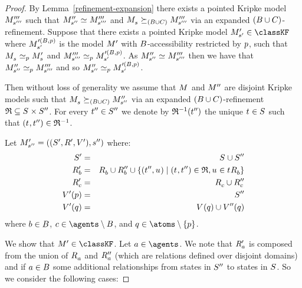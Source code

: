 \begin{proof}
By Lemma~\ref{refinement-expansion} there exists a pointed Kripke model $\kPModelPPP{\kStateSPPP}$ such that $\kPModelPP{\kStateSPP} \bisimilar \kPModelPPP{\kStateSPPP}$ and $\kPModel{\kStateS} \simulates[(\agentsB \cup \agentsC)] \kPModelPPP{\kStateSPPP}$ via an expanded $(\agentsB \cup \agentsC)$-refinement.
Suppose that there exists a pointed Kripke model $\kPModelP{\kStateSP} \in \classKF$ where $\kPModel[\prime(\agentsB, \atomP)]{\kStateSP}$ is the model $\kModelP$ with $\agentsB$-accessibility restricted by $\atomP$, such that $\kPModel{\kStateS} \bisimilar[\atomP] \kPModelP{\kStateS}$ and $\kPModelPPP{\kStateSPPP} \bisimilar[\atomP] \kPModel[\prime(\agentsB, \atomP)]{\kStateSP}$.
As $\kPModelPP{\kStateSPP} \bisimilar \kPModelPPP{\kStateSPPP}$ then we have that $\kPModelPP{\kStateSPP} \bisimilar[\atomP] \kPModelPPP{\kStateSPPP}$ and so $\kPModelPP{\kStateSPP} \bisimilar[\atomP] \kPModel[\prime(\agentsB, \atomP)]{\kStateSP}$.

Then without loss of generality we assume that $\kModel$ and $\kModelPP$ are disjoint Kripke models such that $\kPModel{\kStateS} \simulates[(\agentsB \cup \agentsC)] \kPModelPP{\kStateSPP}$ via an expanded $(\agentsB \cup \agentsC)$-refinement $\refinement \subseteq \kStates \times \kStatesPP$.
For every $\kStateTPP \in \kStatesPP$ we denote by $\refinement^{-1}(\kStateTPP)$ the unique $\kStateT \in \kStates$ such that $(\kStateT, \kStateTPP) \in \refinement^{-1}$.

Let $\kPModelAndTupleP{\kStateSPP}$ where:
\begin{eqnarray*}
    \kStatesP &=& \kStates \cup \kStatesPP\\
    \kAccessibilityPB &=& \kAccessibilityB \cup \kAccessibilityPPB \cup \{(\kStateTPP, \kStateU)  \mid (\kStateT, \kStateTPP) \in \refinement, \kStateU \in \kSuccessorsB{\kStateT}\}\\
    \kAccessibilityPC &=& \kAccessibilityC \cup \kAccessibilityPPC\\
    \kValuationP(\atomP) &=& \kStatesPP\\
    \kValuationP(\atomQ) &=& \kValuation(\atomQ) \cup \kValuationPP(\atomQ)
\end{eqnarray*}
where $\agentB \in \agentsB$, $\agentC \in \agents \setminus \agentsB$, and $\atomQ \in \atoms \setminus \{\atomP\}$.

We show that $\kModelP \in \classKF$.
Let $\agentA \in \agents$.
We note that $\kAccessibilityPA$ is composed from the union of $\kAccessibilityA$ and $\kAccessibilityPPA$ (which are relations defined over disjoint domains) and if $\agentA \in \agentsB$ some additional relationships from states in $\kStatesPP$ to states in $\kStates$.
So we consider the following cases:


\end{proof}
